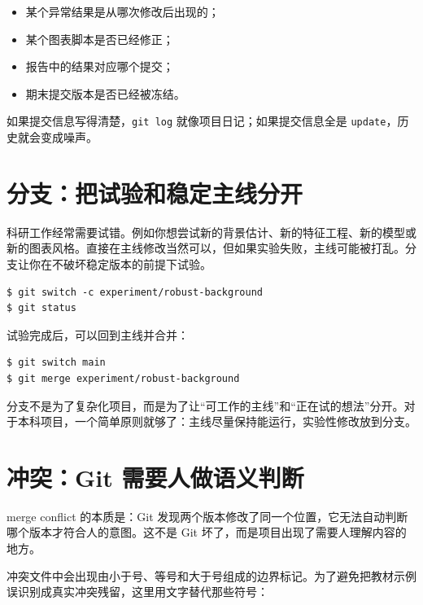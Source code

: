 \begin{itemize}
    \item 某个异常结果是从哪次修改后出现的；
    \item 某个图表脚本是否已经修正；
    \item 报告中的结果对应哪个提交；
    \item 期末提交版本是否已经被冻结。
\end{itemize}

如果提交信息写得清楚，\texttt{git log} 就像项目日记；如果提交信息全是 \texttt{update}，历史就会变成噪声。

\section{分支：把试验和稳定主线分开}

科研工作经常需要试错。例如你想尝试新的背景估计、新的特征工程、新的模型或新的图表风格。直接在主线修改当然可以，但如果实验失败，主线可能被打乱。分支让你在不破坏稳定版本的前提下试验。

\begin{examplebox}[创建试验分支]
\begin{lstlisting}[style=terminal]
$ git switch -c experiment/robust-background
$ git status
\end{lstlisting}
\end{examplebox}

试验完成后，可以回到主线并合并：

\begin{examplebox}[合并分支]
\begin{lstlisting}[style=terminal]
$ git switch main
$ git merge experiment/robust-background
\end{lstlisting}
\end{examplebox}

分支不是为了复杂化项目，而是为了让“可工作的主线”和“正在试的想法”分开。对于本科项目，一个简单原则就够了：主线尽量保持能运行，实验性修改放到分支。

\section{冲突：Git 需要人做语义判断}

merge conflict 的本质是：Git 发现两个版本修改了同一个位置，它无法自动判断哪个版本才符合人的意图。这不是 Git 坏了，而是项目出现了需要人理解内容的地方。

冲突文件中会出现由小于号、等号和大于号组成的边界标记。为了避免把教材示例误识别成真实冲突残留，这里用文字替代那些符号：

